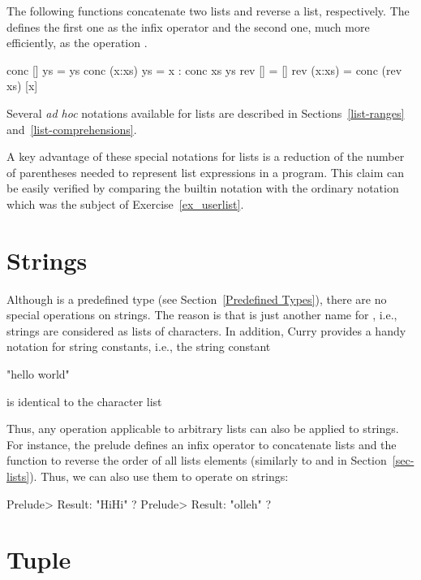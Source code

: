 The following functions concatenate two lists
and reverse a list, respectively.  
The  defines the first one as the infix operator \ccode{++}
and the second one, much more efficiently, as the operation .
%
\begin{prog}
conc []     ys = ys
conc (x:xs) ys = x : conc xs ys
\medskip
rev []     = []
rev (x:xs) = conc (rev xs) [x]
\end{prog}
%
Several \emph{ad hoc} notations available for lists are 
described in Sections~\ref{list-ranges} and~\ref{list-comprehensions}.

A key advantage of these special notations for lists is
a reduction of the number of parentheses needed to represent
list expressions in a program.
This claim can be easily verified by comparing the builtin
notation with the ordinary notation which was the subject of
Exercise~\ref{ex_userlist}.


\section{Strings}

Although  is a predefined type
(see Section~\ref{Predefined Types}), there are no special
operations on strings. The reason is that 
is just another name for \ccode {[Char]}, i.e., strings
are considered as lists of characters. In addition, Curry
provides a handy notation for string constants, i.e.,
the string constant
%
\begin{prog}
"hello world"
\end{prog}
%
is identical to the character list
%
\begin{prog}
['h','e','l','l','o',' ','w','o','r','l','d']
\end{prog}
%
Thus, any operation applicable to arbitrary lists can also be applied
to strings. For instance, the prelude defines an infix operator
\ccode{++}\pindex{++} to concatenate lists and the function
to reverse the order of all lists elements
(similarly to  and  in
Section~\ref{sec-lists}). Thus, we can also use them to operate on
strings:
%
\begin{prog}
Prelude> 
Result: "HiHi" ? 
Prelude> 
Result: "olleh" ? 
\end{prog}


\section{Tuple}

